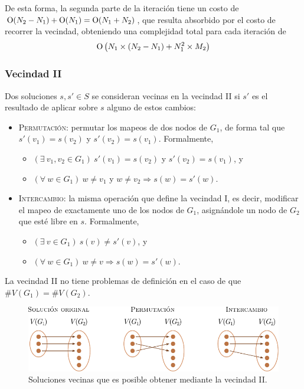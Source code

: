 De esta forma, la segunda parte de la iteración tiene un costo de $\operatorname{O}(N_2 -
N_1) + \operatorname{O}(N_1) = \operatorname{O} (N_1 + N_2)$, que resulta absorbido por el costo de
recorrer la vecindad, obteniendo una complejidad total para cada iteración de
\[ \operatorname{O} \left( N_1 \times (N_2 - N_1) + N_1^2 \times M_2 \right) \]

\subsubsection{Vecindad II}
Dos soluciones $s, s' \in S$ se consideran vecinas en la vecindad II
si $s'$ es el resultado de aplicar sobre $s$ alguno de estos cambios:
\begin{itemize}
    \item \textsc{Permutación:} permutar los mapeos de dos nodos de $G_1$, de
    forma tal que $s'(v_1) = s(v_2)$ y $s'(v_2) = s(v_1)$. Formalmente,
    \begin{itemize}
        \item $(\exists \ v_1, v_2 \in G_1)\ s'(v_1) = s(v_2)$ y $s'(v_2) = s
        (v_1)$, y
        \item $(\forall \ w \in G_1)\ w \neq v_1$ y $w \neq v_2
        \Rightarrow s(w) = s'(w)$.
    \end{itemize}
    \item \textsc{Intercambio:} la misma operación que define la vecindad
    I, es decir, modificar el mapeo de exactamente uno de los nodos
    de $G_1$, asignándole un nodo de $G_2$ que esté libre en $s$. Formalmente,
    \begin{itemize}
        \item $(\exists \ v \in G_1)\ s(v) \neq s'(v)$, y
        \item $(\forall \ w \in G_1)\ w \neq v \Rightarrow s(w) = s'(w)$.
    \end{itemize}
\end{itemize}

La vecindad II no tiene problemas de definición en el caso de que $\#V(G_1)
= \#V (G_2)$.

\begin{figure}[htbp]
    \centering
    \includegraphics{imagenes/ex5_vecindad2.pdf}
    \caption{Soluciones vecinas que es posible obtener mediante la vecindad
    II.}
    \label{fig:ej5:vecindad2}
\end{figure}

